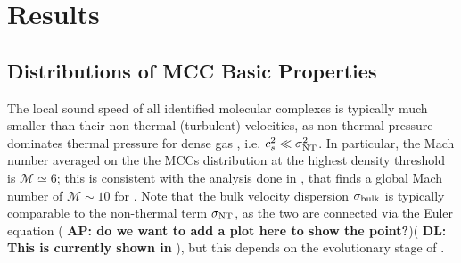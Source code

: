 \IfFileExists{emulateapjlegacy.cls}{\documentclass[iop]{emulateapjlegacy}}{\documentclass[iop]{emulateapj}}
\newcommand{\AP}[1]{({\bf \color{apcolor} AP: #1})}
\newcommand{\DL}[1]{({\bf \color{dlcolor} DL: #1})}
\begin{document}
\section{Results}\label{sec:results}

\subsection{Distributions of MCC Basic Properties}

The local sound speed of all identified molecular complexes is typically much smaller than their non-thermal (turbulent) velocities,
as non-thermal pressure dominates thermal pressure for dense gas \citep{Pallottini17b}, i.e. $c_s^2 \ll \sigma_{\rm NT}^2$.
 In particular, the Mach number averaged on the the MCCs distribution at the highest density threshold is $\mathcal{M} \simeq6$; this is consistent with the analysis done in \citep{Vallini18a}, that finds a global Mach number of $\mathcal{M} \sim 10$ for \flower.
%
Note that the bulk velocity dispersion $\sigma_{\rm bulk}$ is typically comparable to the non-thermal term $\sigma_{\rm NT}$, as the two are connected via the Euler equation \AP{do we want to add a plot here to show the point?}\DL{This is currently shown in }, but this depends on the evolutionary stage of \flower.
%

\end{document}
